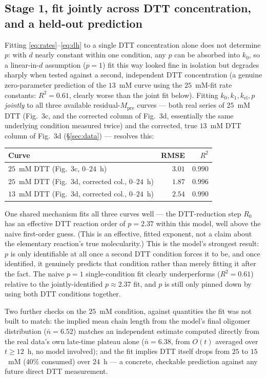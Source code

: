 \documentclass[11pt]{article}
\begin{document}
\subsection{Stage 1, fit jointly across DTT concentration, and a held-out prediction}
\label{sec:ladder-fit}

Fitting \eqref{eq:rates}--\eqref{eq:dh} to a single DTT concentration alone does not
determine $p$: with $d$ nearly constant within one condition, any $p$ can be absorbed into
$k_0$, so a linear-in-$d$ assumption ($p=1$) fit this way looked fine in isolation but degrades
sharply when tested against a second, independent DTT concentration (a genuine
zero-parameter prediction of the $13$~mM curve using the $25$~mM-fit rate constants:
$R^2=0.61$, clearly worse than the joint fit below). Fitting $k_0,k_1,k_{\mathrm{el}},p$
\emph{jointly} to all three available residual-$M_{\mathrm{pre}}$ curves --- both real series
of $25$~mM DTT (Fig.~3c, and the corrected column of Fig.~3d, essentially the same
underlying condition measured twice) and the corrected, true $13$~mM DTT column of Fig.~3d
(\S\ref{sec:data}) --- resolves this:
\begin{center}
\begin{tabular}{lrr}
\toprule
Curve & RMSE & $R^2$\\
\midrule
$25$~mM DTT (Fig.~3c, $0$--$24$~h) & $3.01$ & $0.990$\\
$25$~mM DTT (Fig.~3d, corrected col., $0$--$24$~h) & $1.87$ & $0.996$\\
$13$~mM DTT (Fig.~3d, corrected col., $0$--$24$~h) & $2.54$ & $0.990$\\
\bottomrule
\end{tabular}
\end{center}
One shared mechanism fits all three curves well --- the DTT-reduction step $R_0$ has an
effective DTT reaction order of $p=2.37$ within this model, well above the naive first-order
guess. (This is an effective, fitted exponent, not a claim about the elementary reaction's true
molecularity.) This is the model's
strongest result: $p$ is only identifiable at all once a second DTT
condition forces it to be, and once identified, it genuinely predicts that condition rather
than merely fitting it after the fact. The naive $p=1$ single-condition fit
clearly underperforms ($R^2=0.61$)
relative to the jointly-identified $p\approx2.37$ fit, and $p$ is still only pinned down by using both DTT conditions together.

Two further checks on the $25$~mM condition, against quantities the fit was not built to
match: the implied mean chain length from the model's final oligomer distribution
($\bar n=6.52$) matches an independent estimate computed directly from the real data's own
late-time plateau alone ($\bar n=6.38$, from $O(t)$ averaged over $t\ge12$~h, no model
involved); and the fit implies DTT itself drops from $25$ to $15$~mM ($40\%$
consumed) over $24$~h --- a concrete, checkable prediction against any future direct DTT
measurement.
\end{document}
